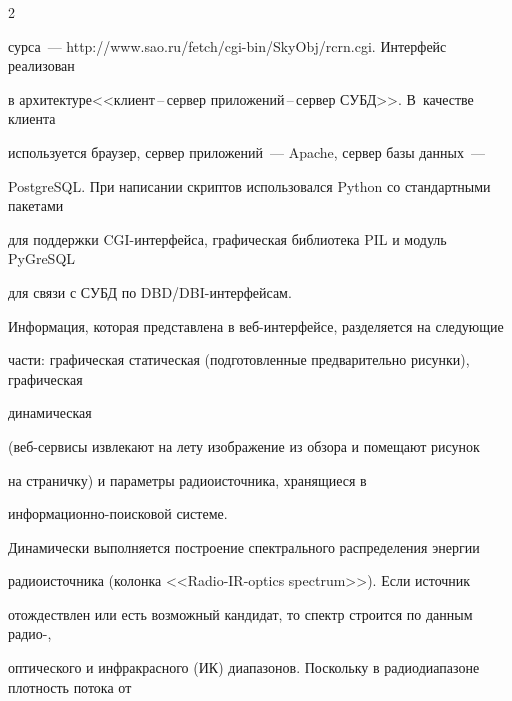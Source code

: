 \begin{multicols}{2}



\noindent

сурса~--- {\sf http://www.sao.ru/fetch/cgi-bin/SkyObj/\linebreak rcrn.cgi}. Интерфейс реализован 

в архитектуре\linebreak <<клиент\,--\,сервер приложений\,--\,сервер СУБД>>. В~качестве клиента 

используется браузер, сервер приложений~--- \mbox{Apache}, сервер базы данных~--- 

\mbox{PostgreSQL}. При написании скриптов использовался Python со стандартными пакетами 

для поддерж\-ки CGI-интер\-фей\-са, графическая биб\-лио\-те\-ка PIL и модуль \mbox{PyGreSQL}

для связи с СУБД по DBD/DBI-интер\-фейсам.



















      Информация, которая представлена в веб-ин\-тер\-фей\-се, разделяется на следующие 

части: графическая статическая (подготовленные предварительно рисунки), графическая 

динамическая\linebreak

 (веб-сер\-ви\-сы извлекают на лету изображение из обзора и помещают рисунок 

на страничку) и параметры радиоисточника, хранящиеся в 

      ин\-фор\-ма\-ци\-он\-но-по\-иско\-вой сис\-теме. 

      

      Динамически выполняется построение спектрального распределения энергии 

радиоисточника (колонка <<Radio-IR-optics spectrum>>). Если источник 

отождествлен или есть возможный кандидат, то спектр строится по данным радио-, 

оптического и инфракрасного (ИК) диапазонов. Поскольку в радиодиапазоне плотность потока от 


\end{multicols}
